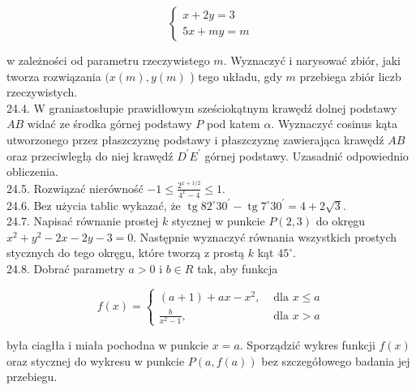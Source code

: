\documentclass[10pt]{article}
\begin{document}
$$
\left\{\begin{array}{l}
x+2 y=3 \\
5 x+m y=m
\end{array}\right.
$$

w zależności od parametru rzeczywistego $m$. Wyznaczyć i narysować zbiór, jaki tworza rozwiązania $(x(m), y(m)$ ) tego układu, gdy $m$ przebiega zbiór liczb rzeczywistych.\\
24.4. W graniastosłupie prawidłowym sześciokątnym krawędź dolnej podstawy $A B$ widać ze środka górnej podstawy $P$ pod katem $\alpha$. Wyznaczyć cosinus kąta utworzonego przez płaszczyznę podstawy i płaszczyznę zawierająca krawędź $A B$ oraz przeciwległạ do niej krawędź $D^{\prime} E^{\prime}$ górnej podstawy. Uzasadnić odpowiednio obliczenia.\\
24.5. Rozwiązać nierówność $-1 \leq \frac{2^{x+1 / 2}}{4^{x}-4} \leq 1$.\\
24.6. Bez użycia tablic wykazać, że $\operatorname{tg} 82^{\circ} 30^{\prime}-\operatorname{tg} 7^{\circ} 30^{\prime}=4+2 \sqrt{3}$.\\
24.7. Napisać równanie prostej $k$ stycznej w punkcie $P(2,3)$ do okręgu $x^{2}+y^{2}-2 x-2 y-3=0$. Następnie wyznaczyć równania wszystkich prostych stycznych do tego okręgu, które tworzą z prostą $k$ kąt $45^{\circ}$.\\
24.8. Dobrać parametry $a>0$ i $b \in R$ tak, aby funkcja

$$
f(x)= \begin{cases}(a+1)+a x-x^{2}, & \text { dla } x \leq a \\ \frac{b}{x^{2}-1}, & \text { dla } x>a\end{cases}
$$

była ciagłła i miała pochodna w punkcie $x=a$. Sporządzić wykres funkcji $f(x)$ oraz stycznej do wykresu w punkcie $P(a, f(a))$ bez szczegółowego badania jej przebiegu.
\end{document}
